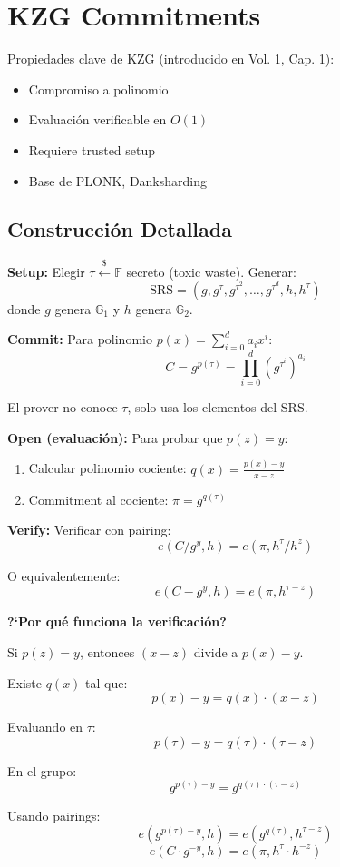\documentclass[11pt,a4paper,twoside]{book}
\newcommand{\F}{\mathbb{F}}
\newcommand{\G}{\mathbb{G}}
\begin{document}
\section{KZG Commitments}

Propiedades clave de KZG (introducido en Vol. 1, Cap. 1):
\begin{itemize}
    \item Compromiso a polinomio
    \item Evaluaci\'on verificable en $O(1)$
    \item Requiere trusted setup
    \item Base de PLONK, Danksharding
\end{itemize}

\subsection{Construcci\'on Detallada}

\begin{definition}
\textbf{Setup:} Elegir $\tau \xleftarrow{\$} \F$ secreto (toxic waste). Generar:
\[ \text{SRS} = (g, g^\tau, g^{\tau^2}, \ldots, g^{\tau^d}, h, h^\tau) \]
donde $g$ genera $\G_1$ y $h$ genera $\G_2$.

\textbf{Commit:} Para polinomio $p(x) = \sum_{i=0}^{d} a_i x^i$:
\[ C = g^{p(\tau)} = \prod_{i=0}^{d} (g^{\tau^i})^{a_i} \]

El prover no conoce $\tau$, solo usa los elementos del SRS.

\textbf{Open (evaluaci\'on):} Para probar que $p(z) = y$:
\begin{enumerate}
    \item Calcular polinomio cociente: $q(x) = \frac{p(x) - y}{x - z}$
    \item Commitment al cociente: $\pi = g^{q(\tau)}$
\end{enumerate}

\textbf{Verify:} Verificar con pairing:
\[ e(C / g^y, h) = e(\pi, h^\tau / h^z) \]

O equivalentemente:
\[ e(C - g^y, h) = e(\pi, h^{\tau - z}) \]
\end{definition}

\begin{mathnote}
\textbf{?`Por qu\'e funciona la verificaci\'on?}

Si $p(z) = y$, entonces $(x - z)$ divide a $p(x) - y$.

Existe $q(x)$ tal que:
\[ p(x) - y = q(x) \cdot (x - z) \]

Evaluando en $\tau$:
\[ p(\tau) - y = q(\tau) \cdot (\tau - z) \]

En el grupo:
\[ g^{p(\tau) - y} = g^{q(\tau) \cdot (\tau - z)} \]

Usando pairings:
\[ e(g^{p(\tau) - y}, h) = e(g^{q(\tau)}, h^{\tau - z}) \]
\[ e(C \cdot g^{-y}, h) = e(\pi, h^\tau \cdot h^{-z}) \]
\end{mathnote}
\end{document}
